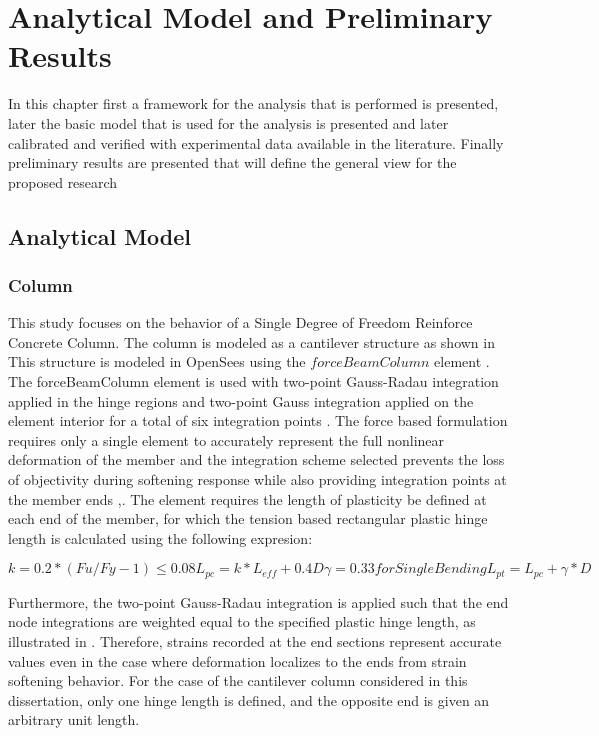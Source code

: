 \chapter{Analytical Model and Preliminary Results}
In this chapter first a framework for the analysis that is performed is presented, later the basic model that is used for the analysis is presented and later calibrated and verified with experimental data available in the literature. Finally preliminary results are presented that will define the general view for the proposed research

\section{Analytical Model}

\subsection{Column}
This study focuses on the behavior of a Single Degree of Freedom Reinforce Concrete Column. The column is modeled as a cantilever structure as shown in  This structure is modeled in OpenSees \cite{McKenna2010} using the $forceBeamColumn$ element \cite{Scott}. The forceBeamColumn element is used with two-point Gauss-Radau integration applied in the hinge regions and two-point Gauss integration applied on the element interior for a total of six integration points \cite{Scott}. The force based formulation requires only a single element to accurately represent the full nonlinear deformation of the member and the integration scheme selected prevents the loss of objectivity during softening response while also providing integration points at the member ends \cite{Calabrese2010},\cite{Scott}. The element requires the length of plasticity be defined at each end of the member, for which the tension based rectangular plastic hinge length is calculated using the following expresion\cite{Goodnight2013}:

\begin{equation}
    k=0.2*(Fu/Fy - 1) \leqslant 0.08
    L_{pc}=k*L_{eff} + 0.4D
    \gamma=0.33 for Single Bending
    L_{pt}=L_{pc}+\gamma*D
\end{equation}

Furthermore, the two-point Gauss-Radau integration is applied such that the end node integrations are weighted equal to the specified plastic hinge length, as illustrated in . Therefore, strains recorded at the end sections represent accurate values even in the case where deformation localizes to the ends from strain softening behavior. For the case of the cantilever column considered in this dissertation, only one hinge length is defined, and the opposite end is given an arbitrary unit length. 

